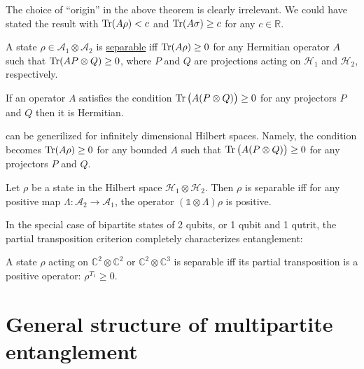 \documentclass[a4paper]{report}
\begin{document}
\begin{remark}
	The choice of ``origin'' in the above theorem is clearly irrelevant.
	We could have stated the result with $\Tr(A\rho) < c$ and
	$\Tr(A\sigma) \ge c$ for any $c \in \mathbb R$.
\end{remark}

\begin{lemma}
	A state $\rho \in \mathcal A_1 \otimes \mathcal A_2$ is \uline{separable} iff
	$\Tr(A\rho) \ge 0$
	for any Hermitian operator $A$ such that
	$\Tr(A P\otimes Q) \ge 0$, where $P$ and $Q$ are projections acting on
	$\mathcal H_1$ and $\mathcal H_2$, respectively.
	\label{lemma:horodecki96_separable_iff_TrArhoPositive}
\end{lemma}

\begin{remark}
	If an operator $A$ satisfies the condition $\Tr\big( A(P \otimes Q) \big) \ge 0$
	for any projectors $P$ and $Q$ then it is Hermitian.
\end{remark}

\begin{remark}
	 can be generilized for infinitely dimensional Hilbert spaces.
	Namely, the condition becomes $\Tr(A\rho) \ge 0$ for any bounded $A$ such that
	$\Tr\big( A(P\otimes Q) \big) \ge 0$ for any projectors $P$ and $Q$.
\end{remark}

\begin{thm}
	Let $\rho$ be a state in the Hilbert space $\mathcal H_1 \otimes \mathcal H_2$.
	Then $\rho$ is separable iff for any positive map
	$\Lambda : \mathcal A_2 \to \mathcal A_1$,
	the operator $(\mathds1 \otimes \Lambda)\rho$ is positive.
\end{thm}

In the special case of bipartite states of 2 qubits, or 1 qubit and 1 qutrit,
the partial transposition criterion completely characterizes entanglement:
\begin{thm}
	A state $\rho$ acting on $\mathbb C^2 \otimes \mathbb C^2$
	or $\mathbb C^2 \otimes \mathbb C^3$ is separable iff
	its partial transposition is a positive operator: $\rho^{T_1} \ge 0$.
\end{thm}

\section{General structure of multipartite entanglement}
\end{document}
